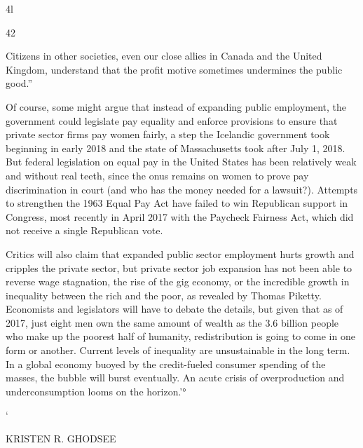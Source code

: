  \par 
4l
 \par 
42
 \par 
Citizens in other societies, even our close allies in Canada and the United Kingdom, understand that the profit motive sometimes undermines the public good.”
 \par 
Of course, some might argue that instead of expanding public employment, the government could legislate pay equality and enforce provisions to ensure that private sector firms pay women fairly, a step the Icelandic government took beginning in early 2018 and the state of Massachusetts took after July 1, 2018. But federal legislation on equal pay in the United States has been relatively weak and without real teeth, since the onus remains on women to prove pay discrimination in court (and who has the money needed for a lawsuit?). Attempts to strengthen the 1963 Equal Pay Act have failed to win Republican support in Congress, most recently in April 2017 with the Paycheck Fairness Act, which did not receive a single Republican vote.
 \par 
Critics will also claim that expanded public sector employment hurts growth and cripples the private sector, but private sector job expansion has not been able to reverse wage stagnation, the rise of the gig economy, or the incredible growth in inequality between the rich and the poor, as revealed by Thomas Piketty. Economists and legislators will have to debate the details, but given that as of 2017, just eight men own the same amount of wealth as the {\color{blue}3}.6 billion people who make up the poorest half of humanity, redistribution is going to come in one form or another. Current levels of inequality are unsustainable in the long term. In a global economy buoyed by the credit-fueled consumer spending of the masses, the bubble will burst eventually. An acute crisis of overproduction and underconsumption looms on the horizon.'°
 \par 
‘
 \par 
KRISTEN R. GHODSEE
 \par 
